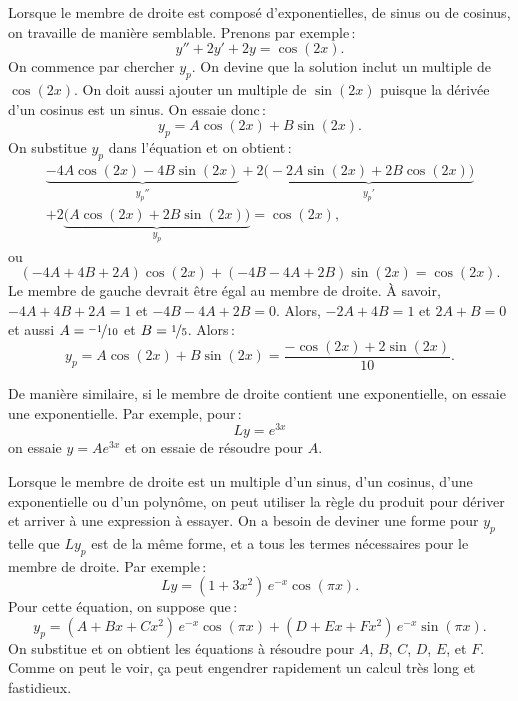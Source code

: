\medskip

Lorsque le membre de droite est composé d'exponentielles, de sinus ou de cosinus, on travaille de manière semblable. Prenons par exemple\,: 
\begin{equation*}
y''+2y'+2y = \cos (2x) .
\end{equation*}
On commence par chercher $y_p$.  On devine que la solution inclut un multiple de  $\cos(2x)$.
On doit aussi ajouter un multiple de $\sin (2x)$ puisque la dérivée d'un cosinus est un sinus. On essaie donc\,: 
\begin{equation*}
y_p = A \cos (2x) + B \sin (2x) .
\end{equation*}
On substitue  $y_p$ dans l'équation et on obtient\,: 
\begin{multline*}
\underbrace{-4 A \cos (2x) - 4 B \sin (2x)}_{y_p''}
+2 \underbrace{\bigl(-2A \sin (2x) + 2B \cos (2x)\bigr)}_{y_p'}
\\
+
2 \underbrace{\bigl(A \cos (2x) + 2B \sin (2x)\bigr)}_{y_p}
= \cos (2x) ,
\end{multline*}
ou
\begin{equation*}
(-4A+4B+2A) \cos(2x) +
(-4B-4A+2B) \sin(2x)
= \cos(2x) .
\end{equation*}
Le membre de gauche devrait être égal au membre de droite. À savoir,
$-4A + 4B + 2A = 1$ et
$-4B - 4A + 2B = 0$.  Alors, $-2A+4B =1$ et $2A+B=0$ et aussi  
$A=\nicefrac{-1}{10}$ et $B=\nicefrac{1}{5}$.  Alors\,: 
\begin{equation*}
y_p = A \cos (2x) + B \sin (2x) = \frac{-\cos (2x) + 2 \sin (2x)}{10} .
\end{equation*}

De manière similaire, si le membre de droite contient une exponentielle, on essaie une exponentielle. Par exemple, pour\,: 
\begin{equation*}
Ly = e^{3x}
\end{equation*}
on essaie $y = A e^{3x}$ et on essaie de résoudre pour $A$.

\medskip

Lorsque le membre de droite est un multiple d'un sinus, d'un cosinus, d'une exponentielle ou d'un polynôme, on peut utiliser la règle du produit pour dériver et arriver à une expression à essayer. On a besoin de deviner une forme pour $y_p$ telle que $Ly_p$ est de la même forme, et a tous les termes nécessaires pour le membre de droite. Par exemple\,: 
\begin{equation*}
Ly = (1+3x^2)\,e^{-x}\cos (\pi x) .
\end{equation*}
Pour cette équation, on suppose que\,: 
\begin{equation*}
y_p = (A + Bx + Cx^2)\,e^{-x} \cos (\pi x) + 
(D + Ex + Fx^2)\,e^{-x} \sin (\pi x) .
\end{equation*}
On substitue et on obtient les équations à résoudre pour 
$A$, $B$, $C$, $D$, $E$, et $F$.
Comme on peut le voir, ça peut engendrer rapidement un calcul très long et fastidieux.  

